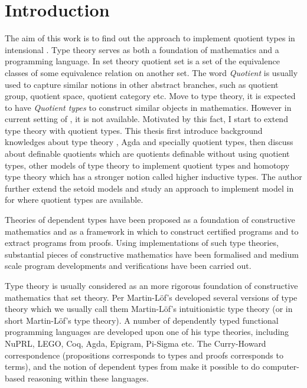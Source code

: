 \chapter{Introduction}

The aim of this work is to find out the approach to implement quotient
types in intensional \mltt. Type theory serves as both a foundation of
mathematics and a programming language. In set theory quotient set is
a set of the equivalence classes of some equivalence relation on
another set. The word \emph{Quotient} is usually used to capture
similar notions in other abstract branches, such as quotient group,
quotient space, quotient category etc. Move to type theory, it is
expected to have \emph{Quotient types} to construct similar objects in
mathematics. However in current setting of \itt, it is not
available. Motivated by this fact, I start to extend type theory with
quotient types. This thesis first
introduce background knowledges about type theory , Agda and specially
quotient types, then discuss about definable quotients which are
quotients definable without using quotient types, other models of type
theory to implement quotient types and homotopy type theory which has
a stronger notion called higher inductive types. The author further
extend the setoid models and study an approach to implement \wog model
in \itt for \hott where quotient types are available.






Theories of dependent types have been proposed as a foundation of constructive mathematics and as a framework in which to construct certified programs and to extract programs from proofs. Using implementations of such type theories, substantial pieces of constructive mathematics have been formalised and medium scale program developments and verifications have been carried out.

Type theory is usually considered as an more rigorous foundation of
constructive mathematics that set theory. Per Martin-L\"{o}f's developed several
versions of type theory which we usually call them Martin-Löf's
intuitionistic type theory (or in short Martin-Löf's type theory). A number of
dependently typed functional programming languages are developed upon
one of his type theories, including NuPRL, LEGO, Coq, Agda, Epigram, Pi-Sigma etc.
The Curry-Howard correspondence (propositions corresponds to types and
proofs corresponds to terms), and the notion of dependent types from
\mltt make it possible to do computer-based reasoning within these
languages.

